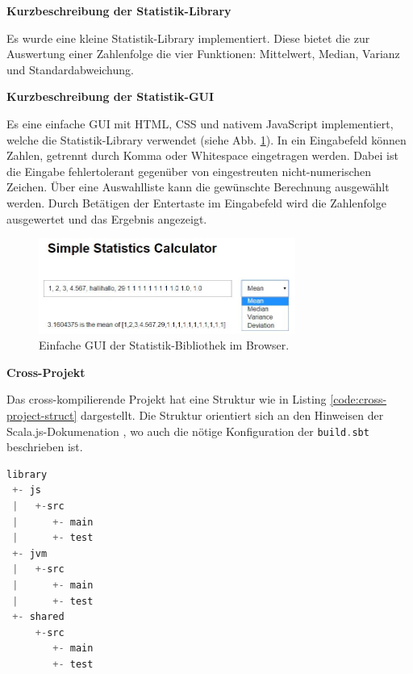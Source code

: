 \documentclass[a4paper, 12pt, hidelinks, listof=totoc, listoftables=totoc, bibliography=totoc]{scrreprt}
\newcommand{\code}[1]{\lstinline[language=Scala, style=inline]|#1|}
\newcommand{\MyMiniSec}[1]{\rmfamily\fontsize{12}{15}\selectfont
	\vspace{7pt}\textbf{#1} %
}
\begin{document}


\MyMiniSec{Kurzbeschreibung der Statistik-Library}

Es wurde eine kleine Statistik-Library implementiert. Diese bietet die zur Auswertung einer Zahlenfolge die 
vier Funktionen: Mittelwert, Median, Varianz und Standardabweichung.

\MyMiniSec{Kurzbeschreibung der Statistik-GUI}

Es eine einfache GUI mit \ac{HTML}, \ac{CSS} und nativem JavaScript implementiert, welche die Statistik-Library verwendet
(siehe Abb. \ref{fig:stat-lib-gui}). In ein Eingabefeld können Zahlen, getrennt durch Komma oder Whitespace eingetragen werden. Dabei ist die Eingabe fehlertolerant gegenüber von eingestreuten nicht-numerischen Zeichen. Über eine Auswahlliste kann die gewünschte Berechnung ausgewählt werden. Durch Betätigen der Entertaste im Eingabefeld wird die Zahlenfolge ausgewertet und das Ergebnis angezeigt.

\begin{figure}[!h]
    \centering
    \includegraphics[width=0.75\textwidth, frame]{statistics-lib/statistics-gui}
    \caption{Einfache GUI der Statistik-Bibliothek im Browser.}
    \label{fig:stat-lib-gui}
\end{figure}


\MyMiniSec{Cross-Projekt}

Das cross-kompilierende Projekt hat eine Struktur wie in Listing \ref{code:cross-project-struct} dargestellt. Die Struktur orientiert sich an den Hinweisen der Scala.js-Dokumenation \cite{scalajs.CBP}, wo auch die nötige Konfiguration der \code{build.sbt} beschrieben ist.

\begin{lstlisting}[language=scala, caption={Grobstruktur der cross-kompilierenden Scala.js-Library}, label={code:cross-project-struct}]
library
 +- js
 |   +-src
 |      +- main
 |      +- test
 +- jvm
 |   +-src
 |      +- main
 |      +- test
 +- shared
     +-src
        +- main
        +- test
\end{lstlisting}
\end{document}
